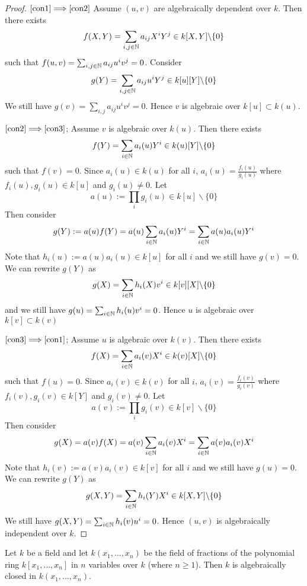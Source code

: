 \begin{proof}
$\eqref{con1}  \Longrightarrow \eqref{con2} $ Assume $(u,v)$ 
are algebraically dependent over $k$. Then there 
exists $$ f(X,Y) = \sum_{i,j \in \mathbb{N}} a_{ij} X^iY^j \in 
k[X,Y] \backslash \lbrace 0 \rbrace $$ such that
$f(u,v) = \sum_{i,j \in \mathbb{N}} a_{ij} u^iv^j = 0 $. 
Consider $$g(Y) = \sum_{i,j \in \mathbb{N}} a_{ij} u^iY^j 
\in k[u][Y] \backslash \lbrace 0 \rbrace $$ We still 
have $g(v) = \sum_{i,j} a_{ij} u^iv^j = 0 $. 
Hence $v$ is algebraic over $k[u] \subset k(u)$. 


$\eqref{con2} \Longrightarrow \eqref{con3} $; Assume $v$ is 
algebraic over $k(u)$. Then there exists
$$ f(Y) = \sum_{i\in \mathbb{N}} a_i(u)Y^i \in k(u)[Y] \backslash \lbrace 0 \rbrace $$ 
such that $f(v) = 0$. Since $a_i(u) \in k(u)$ for 
all $i$, $a_i(u) = \frac{f_i(u)}{g_i(u)} $ 
where $f_i(u),g_i(u) \in k[u]$ and $g_i(u) \neq 0 $. 
Let $$a(u) := \prod_i g_i(u) \in k[u] \backslash \lbrace 0 \rbrace $$ 
Then consider $$ g(Y) := a(u)f(Y) = a(u)\sum_{i\in \mathbb{N}}
a_i(u)Y^i = \sum_{i \in \mathbb{N}}a(u) a_i(u)Y^i $$ 
Note that $h_i(u):=a(u)a_i(u) \in k[u] $ for all $i$ 
and we still have $g(v) = 0 $. We can rewrite $g(Y)$ 
as $$ g(X) = \sum_{i \in \mathbb{N}} h_i(X)v^i \in k[v][X] \backslash \lbrace 0 \rbrace $$ 
and we still have  $g(u) = \sum_{i \in \mathbb{N}} h_i(u) v^i = 0 $. 
Hence $u$ is algebraic over $k[v] \subset k(v)$ 

$\eqref{con3} \Longrightarrow \eqref{con1}$; 
Assume $u$ is algebraic over $k(v)$. Then there 
exists $$ f(X) = \sum_{i \in \mathbb{N} } a_i(v)X^i \in k(v)[X] 
\backslash \lbrace 0 \rbrace $$ such that $f(u) = 0$. 
Since $a_i(v) \in k(v) $ for all $i$, $a_i(v)= \frac{f_i(v)}{g_i(v)}$ 
where $f_i(v),g_i(v) \in k[Y]$ and $g_i(v) \neq 0 $. 
Let $$a(v) := \prod_i g_i(v) \in k[v] \backslash \lbrace 0 \rbrace  $$ 
Then consider $$ g(X) = a(v)f(X) = a(v)\sum_{i \in \mathbb{N}} a_i(v)X^i 
= \sum_{i \in \mathbb{N}} a(v)a_i(v)X^i $$ Note that
$h_i(v):=a(v)a_i(v) \in k[v] $ for all $i$ and we still 
have $g(u) = 0 $. We can rewrite $g(Y)$ as
$$ g(X,Y) = \sum_{i \in \mathbb{N}} h_i(Y)X^i \in k[X,Y] 
\backslash \lbrace 0 \rbrace  $$ We still have
$g(X,Y) = \sum_{i \in \mathbb{N}} h_i(v) u^i = 0 $. 
Hence $(u,v)$ is algebraically independent over $k$.
\end{proof}

\begin{lemma} \label {z0cb9182wbxi81f6}
Let $k$ be a field and let $k(x_1, \dots, x_n)$ be 
the field of fractions of the
polynomial ring  $k[x_1, \dots, x_n]$ in $n$ variables 
over $k$ (where $n \ge 1$).
Then $k$ is algebraically closed in $k(x_1, \dots, x_n)$.
\end{lemma}

